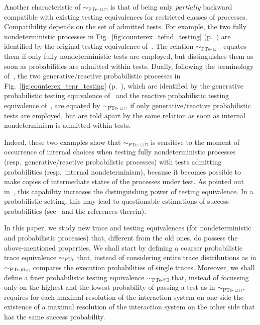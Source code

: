 \documentclass{LMCS}
\newcommand{\sbis}[1]
	{\sim_{#1}}
\begin{document}
Another characteristic of $\sbis{\textrm{PTe-}\sqcup\sqcap}$ is that of being only \emph{partially} backward
compatible with existing testing equivalences for restricted classes of processes. Compatibility depends on
the set of admitted tests. For example, the two fully nondeterministic processes in
Fig.~\ref{fig:counterex_tefnd_testing} (p.~\pageref{fig:counterex_tefnd_testing}) are identified by the
original testing equivalence of~\cite{DH84}. The relation $\sbis{\textrm{PTe-}\sqcup\sqcap}$ equates them if
only fully nondeterministic tests are employed, but distinguishes them as soon as probabilities are admitted
within tests. Dually, following the terminology of~\cite{GSS95}, the two generative/reactive probabilistic
processes in Fig.~\ref{fig:counterex_tepr_testing} (p.~\pageref{fig:counterex_tepr_testing}), which are
identified by the generative probabilistic testing equivalence of~\cite{CDSY99} and the reactive
probabilistic testing equivalence of~\cite{KN98}, are equated by $\sbis{\textrm{PTe-}\sqcup\sqcap}$ if only
generative/reactive probabilistic tests are employed, but are told apart by the same relation as soon as
internal nondeterminism is admitted within tests.

Indeed, these two examples show that $\sbis{\textrm{PTe-}\sqcup\sqcap}$ is sensitive to the moment of
occurrence of internal choices when testing fully nondeterministic processes (resp.\ generative/reactive
probabilistic processes) with tests admitting probabilities (resp.\ internal nondeterminism), because it
becomes possible to make copies of intermediate states of the processes under test. As pointed out
in~\cite{Abr87}, this capability increases the distinguishing power of testing equivalence. In a
probabilistic setting, this may lead to questionable estimations of success probabilities (see~\cite{GA12}
and the references therein).

In this paper, we study new trace and testing equivalences (for nondeterministic and probabilistic
processes) that, different from the old ones, do possess the above-mentioned properties. We shall start by
defining a coarser probabilistic trace equivalence $\sbis{\rm PTr}$ that, instead of considering entire
trace distributions as in $\sbis{\rm PTr,dis}$, compares the execution probabilities of single traces.
Moreover, we shall define a finer probabilistic testing equivalence $\sbis{\textrm{PTe-}\forall\exists}$
that, instead of focussing only on the highest and the lowest probability of passing a test as in
$\sbis{\textrm{PTe-}\sqcup\sqcap}$, requires for each maximal resolution of the interaction system on one
side the existence of a maximal resolution of the interaction system on the other side that has the same
success probability.
\end{document}
